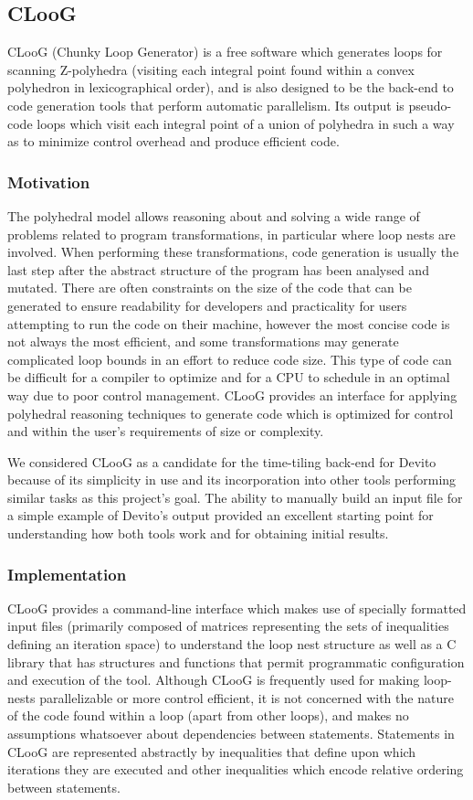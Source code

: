 \documentclass[a4paper,12pt,twoside]{report}
\begin{document}
\begin{itemize}
\subsection{CLooG}
CLooG (Chunky Loop Generator) is a free software which generates loops for scanning Z-polyhedra (visiting each integral
point found within a convex polyhedron in lexicographical order), and is also designed to be
the back-end to code generation tools that perform automatic parallelism. Its output is pseudo-code loops which visit
each integral point of a union of polyhedra in such a way as to minimize control overhead and produce efficient code.

\subsubsection{Motivation}
The polyhedral model allows reasoning about and solving a wide range of problems related to program transformations,
in particular where loop nests are involved. When performing these transformations, code generation is usually the last
step after the abstract structure of the program has been analysed and mutated. There are often constraints on the size of the code
that can be generated to ensure readability for developers and practicality for users attempting to run the code on their machine,
however the most concise code is not always the most efficient, and some transformations may generate complicated loop bounds in an effort
to reduce code size. This type of code can be difficult for a compiler to optimize and for a CPU to schedule in an optimal way due to
poor control management. CLooG provides an interface for applying polyhedral reasoning techniques to generate code which is optimized for control
and within the user's requirements of size or complexity.

We considered CLooG as a candidate for the time-tiling back-end for Devito because of its simplicity in use and its incorporation into
other tools performing similar tasks as this project's goal. The ability to manually build an input file for a simple example of Devito's
output provided an excellent starting point for understanding how both tools work and for obtaining initial results.
\subsubsection{Implementation}
CLooG provides a command-line interface which makes use of specially formatted input files (primarily composed of matrices representing
the sets of inequalities defining an iteration space) to understand the loop nest structure as well as a C library that has structures and
functions that permit programmatic configuration and execution of the tool.
Although CLooG is frequently used for making loop-nests parallelizable or more control efficient, it is not concerned with the nature of the
code found within a loop (apart from other loops), and makes no assumptions whatsoever about dependencies between statements.
Statements in CLooG are represented abstractly by inequalities that define upon which iterations they are executed and other inequalities
which encode relative ordering between statements.


\end{itemize}
\end{document}
